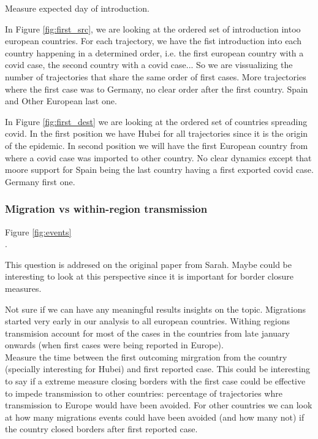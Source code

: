 \documentclass[12pt,]{article}
\begin{document}
Measure expected day of introduction.



In Figure \ref{fig:first_src}, we are looking at the ordered set of introduction intoo european countries. For each trajectory, we have the fist introduction into each country happening in a determined order, i.e. the first european country with a covid case, the second country with a covid case... So we are vissualizing the number of trajectories that share the same order of first cases. More trajectories where the first case was to Germany, no clear order after the first country. Spain and Other European last one.\\




In Figure \ref{fig:first_dest} we are looking at the ordered set of countries spreading covid. In the first position we have Hubei for all trajectories since it is the origin of the epidemic. In second position we will have the first European country from where a covid case was imported to other country. No clear dynamics except that moore support for Spain being the last country having a first exported covid case. Germany first one.\\  


\subsubsection*{Migration vs within-region transmission}

Figure \ref{fig:events}\\.


This question is addresed on the original paper from Sarah.  Maybe could be interesting to look at this perspective since it is important for border closure measures.

 Not sure if we can have any meaningful results insights on the topic. Migrations started very early in our analysis to all european countries. Withing regions transmision account for most of the cases in the countries from late january onwards (when first cases were being reported in Europe).\\

 Measure the time between the first outcoming mirgration from the country  (specially interesting for Hubei) and first reported case. This could be interesting to say if a extreme measure closing borders with the first case could be effective to impede transmission to other countries: percentage of trajectories whre transmission to Europe would have been avoided. For other countries we can look at how many migrations events could have been avoided (and how many not) if the country closed borders after first reported case.\\ 
\end{document}
